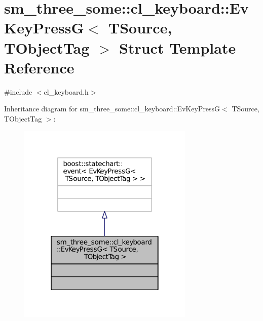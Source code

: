\hypertarget{structsm__three__some_1_1cl__keyboard_1_1EvKeyPressG}{}\section{sm\+\_\+three\+\_\+some\+:\+:cl\+\_\+keyboard\+:\+:Ev\+Key\+PressG$<$ T\+Source, T\+Object\+Tag $>$ Struct Template Reference}
\label{structsm__three__some_1_1cl__keyboard_1_1EvKeyPressG}


{\ttfamily \#include $<$cl\+\_\+keyboard.\+h$>$}



Inheritance diagram for sm\+\_\+three\+\_\+some\+:\+:cl\+\_\+keyboard\+:\+:Ev\+Key\+PressG$<$ T\+Source, T\+Object\+Tag $>$\+:
\nopagebreak
\begin{figure}[H]
\begin{center}
\leavevmode
\includegraphics[width=238pt]{structsm__three__some_1_1cl__keyboard_1_1EvKeyPressG__inherit__graph}
\end{center}
\end{figure}


